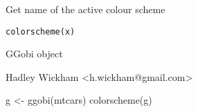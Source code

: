 \begin{Description}\relax
Get name of the active colour scheme
\end{Description}
\begin{Usage}
\begin{verbatim}colorscheme(x)\end{verbatim}
\end{Usage}
\begin{Arguments}
\begin{ldescription}
\item[\code{x}] GGobi object
\end{ldescription}
\end{Arguments}
\begin{Details}\relax
\end{Details}
\begin{Author}\relax
Hadley Wickham <h.wickham@gmail.com>
\end{Author}
\begin{Examples}
\begin{ExampleCode}g <- ggobi(mtcars)
colorscheme(g)\end{ExampleCode}
\end{Examples}

